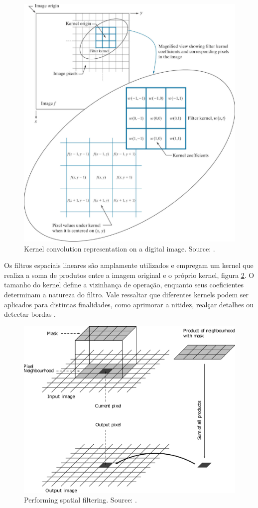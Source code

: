 \begin{figure}[h!]
\centering
\includegraphics[width=.65\linewidth]{images/Development/chap3/kernel.png}
\caption{Kernel convolution representation on a digital image. Source: \cite{gonzalez_rafael_c_digital_2018}.}
\label{fig:kernel-convolution}
\end{figure}


Os filtros espaciais lineares são amplamente utilizados e empregam um kernel que realiza a soma de produtos entre a imagem original e o próprio kernel, figura \ref{fig:kernel-transformation}. O tamanho do kernel define a vizinhança de operação, enquanto seus coeficientes determinam a natureza do filtro. Vale ressaltar que diferentes kernels podem ser aplicados para distintas finalidades, como aprimorar a nitidez, realçar detalhes ou detectar bordas \cite{gonzalez_rafael_c_digital_2018}.

\begin{figure}[h!]
\centering
\includegraphics[width=.65\linewidth]{images/Development/chap3/transformation.png}
\caption{Performing spatial filtering. Source: \cite{mcandrew2004introduction}.}
\label{fig:kernel-transformation}
\end{figure}

